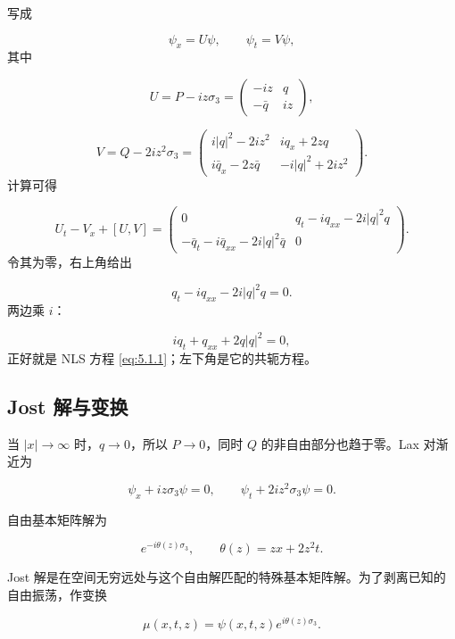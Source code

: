 \documentclass[
    lang=cn,
    scheme=chinese,
    mode=simple,
    device=normal,
    color=blue,
    math=cm,
    thmcnt=section,
    12pt
]{elegantbook}
\begin{document}
\begin{callout}
    写成

    \[
        \psi_x=U\psi,\qquad
        \psi_t=V\psi,
    \]
    其中

    \[
        U=
        P-iz\sigma_3
        =
        \begin{pmatrix}
            -iz     & q  \\
            -\bar q & iz
        \end{pmatrix},
    \]

    \[
        V=
        Q-2iz^2\sigma_3
        =
        \begin{pmatrix}
            i|q|^2-2iz^2       & iq_x+2zq      \\
            i\bar q_x-2z\bar q & -i|q|^2+2iz^2
        \end{pmatrix}.
    \]
    计算可得

    \[
        U_t-V_x+[U,V]
        =
        \begin{pmatrix}
            0                                    &
            q_t-iq_{xx}-2i|q|^2q                   \\
            -\bar q_t-i\bar q_{xx}-2i|q|^2\bar q &
            0
        \end{pmatrix}.
    \]
    令其为零，右上角给出

    \[
        q_t-iq_{xx}-2i|q|^2q=0.
    \]
    两边乘 $i$：

    \[
        iq_t+q_{xx}+2q|q|^2=0,
    \]
    正好就是 NLS 方程 \eqref{eq:5.1.1}；左下角是它的共轭方程。
\end{callout}

\subsection{Jost 解与变换}

当 $\lvert x\rvert\to\infty$ 时，$q\to0$，所以 $P\to0$，同时 $Q$ 的非自由部分也趋于零。Lax 对渐近为

\[
    \psi_x+iz\sigma_3\psi=0,\qquad
    \psi_t+2iz^2\sigma_3\psi=0.
\]

自由基本矩阵解为

\[
    e^{-i\theta(z)\sigma_3},
    \qquad
    \theta(z)=zx+2z^2t.
\]

Jost 解是在空间无穷远处与这个自由解匹配的特殊基本矩阵解。为了剥离已知的自由振荡，作变换

\begin{equation}
    \mu(x,t,z)=\psi(x,t,z)e^{i\theta(z)\sigma_3}.
    \tag{5.1.5}
    \label{eq:5.1.5}
\end{equation}
\end{document}
